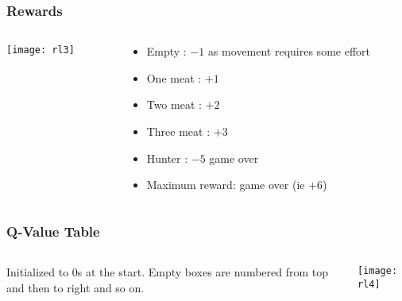 \begin{frame}[fragile]\frametitle{Rewards}

\begin{columns}
\begin{column}{0.5\textwidth}

\begin{center}
\texttt{[image: rl3]}
\end{center}

\end{column}
\begin{column}{0.5\textwidth}  %

\begin{itemize}
\item Empty : $-1$ as movement requires some effort
\item One meat : $+1$
\item Two meat : $+2$
\item Three meat : $+3$
\item Hunter : $-5$ game over
\item Maximum reward: game over (ie $+6$)
\end{itemize}

\end{column}
\end{columns}

\end{frame}

\begin{frame}[fragile]\frametitle{Q-Value Table}

\begin{columns}
\begin{column}{0.5\textwidth}
Initialized to 0s at the start. Empty boxes are numbered from top and then to right and so on.

\end{column}
\begin{column}{0.5\textwidth}  %
\begin{center}
\texttt{[image: rl4]}
\end{center}
\end{column}
\end{columns}
\end{frame}

